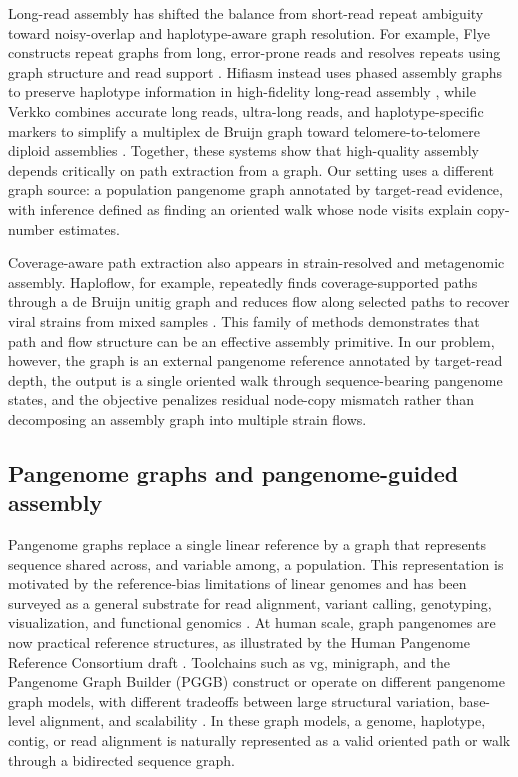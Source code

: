 \documentclass[11pt]{article}
\begin{document}
Long-read assembly has shifted the balance from short-read repeat ambiguity toward noisy-overlap and haplotype-aware graph resolution. For example, Flye constructs repeat graphs from long, error-prone reads and resolves repeats using graph structure and read support \citep{kolmogorov2019flye}. Hifiasm instead uses phased assembly graphs to preserve haplotype information in high-fidelity long-read assembly \citep{cheng2021hifiasm}, while Verkko combines accurate long reads, ultra-long reads, and haplotype-specific markers to simplify a multiplex de Bruijn graph toward telomere-to-telomere diploid assemblies \citep{rautiainen2023verkko}. Together, these systems show that high-quality assembly depends critically on path extraction from a graph. Our setting uses a different graph source: a population pangenome graph annotated by target-read evidence, with inference defined as finding an oriented walk whose node visits explain copy-number estimates.

Coverage-aware path extraction also appears in strain-resolved and metagenomic assembly. Haploflow, for example, repeatedly finds coverage-supported paths through a de Bruijn unitig graph and reduces flow along selected paths to recover viral strains from mixed samples \citep{fritz2021haploflow}. This family of methods demonstrates that path and flow structure can be an effective assembly primitive. In our problem, however, the graph is an external pangenome reference annotated by target-read depth, the output is a single oriented walk through sequence-bearing pangenome states, and the objective penalizes residual node-copy mismatch rather than decomposing an assembly graph into multiple strain flows.

\subsection{Pangenome graphs and pangenome-guided assembly}

Pangenome graphs replace a single linear reference by a graph that represents sequence shared across, and variable among, a population. This representation is motivated by the reference-bias limitations of linear genomes \citep{ballouz2019reference} and has been surveyed as a general substrate for read alignment, variant calling, genotyping, visualization, and functional genomics \citep{eizenga2020pangenome,matthews2024gentle}. At human scale, graph pangenomes are now practical reference structures, as illustrated by the Human Pangenome Reference Consortium draft \citep{liao2023draft}. Toolchains such as vg, minigraph, and the Pangenome Graph Builder (PGGB) construct or operate on different pangenome graph models, with different tradeoffs between large structural variation, base-level alignment, and scalability \citep{hickey2020vg,li2020minigraph,garrison2024pggb}. In these graph models, a genome, haplotype, contig, or read alignment is naturally represented as a valid oriented path or walk through a bidirected sequence graph.
\end{document}

